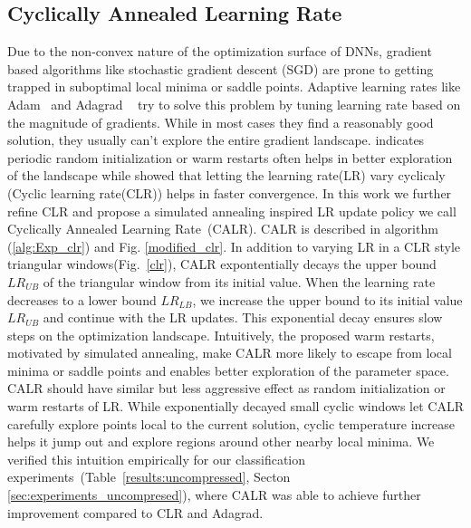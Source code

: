 \subsection{Cyclically Annealed Learning Rate }
\label{subsec:method_training_scheme}
Due to the non-convex nature of the optimization surface of DNNs, gradient based algorithms like stochastic gradient descent (SGD) are prone to getting trapped in suboptimal local minima or saddle points. Adaptive learning rates like Adam~\cite{kingma2014adam} and Adagrad ~\cite{duchi2011adaptive} try to solve this problem by tuning learning rate based on the magnitude of gradients. While in most cases they find a reasonably good solution, they usually can't explore the entire gradient landscape. \cite{bergstra2012random,loshchilov2016sgdr} indicates periodic random initialization or warm restarts often helps in better exploration of the landscape while \cite{smith2017cyclical} showed that letting the learning rate(LR) vary cyclicaly (Cyclic learning rate(CLR)) helps in faster convergence.  
In this work we further refine CLR and propose a simulated annealing inspired LR update policy we call Cyclically Annealed Learning
Rate~(CALR). CALR is described in algorithm (\ref{alg:Exp_clr}) and Fig. \ref{modified_clr}. In addition to varying LR in a CLR style triangular windows(Fig.~\ref{clr}), CALR expontentially decays the upper bound $LR_{UB}$ of the triangular window from its initial value. When the learning rate decreases to a lower bound $LR_{LB}$, we increase the upper bound to its initial value $LR_{UB}$ and continue with the LR updates. This exponential decay ensures slow steps on the optimization
landscape. Intuitively, the proposed warm restarts, motivated by simulated annealing, make
CALR more likely to escape from local minima or saddle points and enables better
exploration of the parameter space.  CALR should have similar but less
aggressive effect as random initialization or warm restarts of LR. While exponentially decayed small
cyclic windows let CALR carefully explore points local to the current solution,
cyclic temperature increase helps it jump out and explore regions around other
nearby local minima. We verified this intuition empirically for our
classification experiments~(Table~\ref{results:uncompressed}, Secton \ref{sec:experiments_uncompresed}), where CALR was
able to achieve further improvement compared to CLR and Adagrad.

